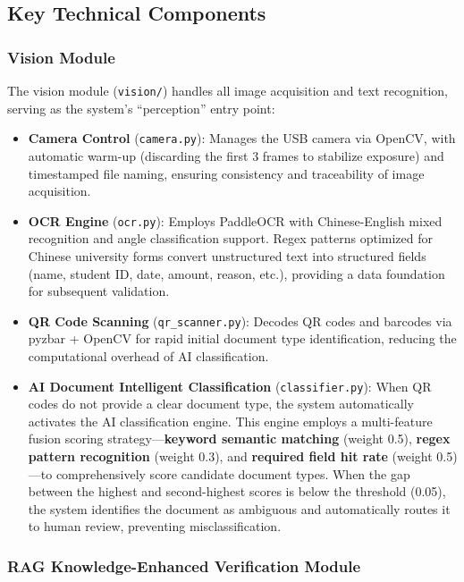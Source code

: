 \documentclass[conference]{IEEEtran}
\begin{document}
\subsection{Key Technical Components}

\subsubsection{Vision Module}

The vision module (\texttt{vision/}) handles all image acquisition and text recognition, serving as the system's ``perception'' entry point:

\begin{itemize}[leftmargin=*]
    \item \textbf{Camera Control} (\texttt{camera.py}): Manages the USB camera via OpenCV, with automatic warm-up (discarding the first 3 frames to stabilize exposure) and timestamped file naming, ensuring consistency and traceability of image acquisition.
    \item \textbf{OCR Engine} (\texttt{ocr.py}): Employs PaddleOCR with Chinese-English mixed recognition and angle classification support. Regex patterns optimized for Chinese university forms convert unstructured text into structured fields (name, student ID, date, amount, reason, etc.), providing a data foundation for subsequent validation.
    \item \textbf{QR Code Scanning} (\texttt{qr\_scanner.py}): Decodes QR codes and barcodes via pyzbar + OpenCV for rapid initial document type identification, reducing the computational overhead of AI classification.
    \item \textbf{AI Document Intelligent Classification} (\texttt{classifier.py}): When QR codes do not provide a clear document type, the system automatically activates the AI classification engine. This engine employs a multi-feature fusion scoring strategy---\textbf{keyword semantic matching} (weight 0.5), \textbf{regex pattern recognition} (weight 0.3), and \textbf{required field hit rate} (weight 0.5)---to comprehensively score candidate document types. When the gap between the highest and second-highest scores is below the threshold (0.05), the system identifies the document as ambiguous and automatically routes it to human review, preventing misclassification.
\end{itemize}

\subsubsection{RAG Knowledge-Enhanced Verification Module}
\end{document}
